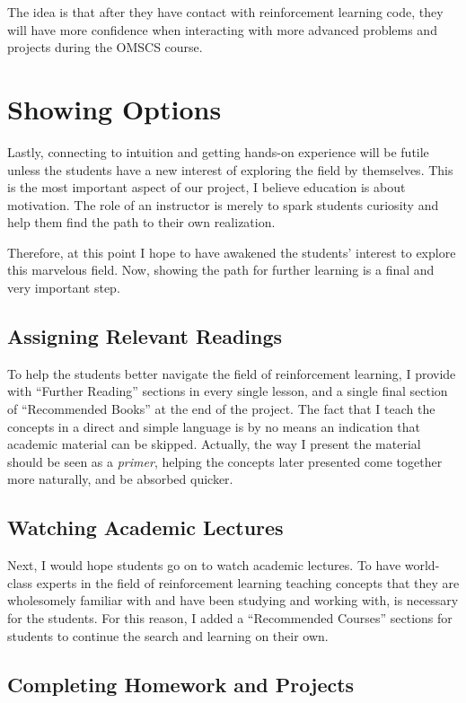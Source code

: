 \documentclass[11pt]{article} %
\begin{document}
The idea is that after they have contact with reinforcement learning code, they
will have more confidence when interacting with more advanced problems and
projects during the OMSCS course.

\section{Showing Options}

Lastly, connecting to intuition and getting hands-on experience will be
futile unless the students have a new interest of exploring the field by
themselves. This is the most important aspect of our project, I believe
education is about motivation. The role of an instructor is merely to spark
students curiosity and help them find the path to their own realization.

Therefore, at this point I hope to have awakened the students' interest to
explore this marvelous field. Now, showing the path for further learning is
a final and very important step.

\subsection{Assigning Relevant Readings}

To help the students better navigate the field of reinforcement learning,
I provide with ``Further Reading'' sections in every single lesson, and a
single final section of ``Recommended Books'' at the end of the project. The fact
that I teach the concepts in a direct and simple language is by no means
an indication that academic material can be skipped. Actually, the way I 
present the material should be seen as a \emph{primer}, helping the
concepts later presented come together more naturally, and be absorbed quicker.

\subsection{Watching Academic Lectures}

Next, I would hope students go on to watch academic lectures.
To have world-class experts in the field of reinforcement learning teaching
concepts that they are wholesomely familiar with and have been studying and working with, 
 is necessary for the students. For this reason, I added a ``Recommended Courses''
sections for students to continue the search and learning on their own.

\subsection{Completing Homework and Projects}
\end{document}
